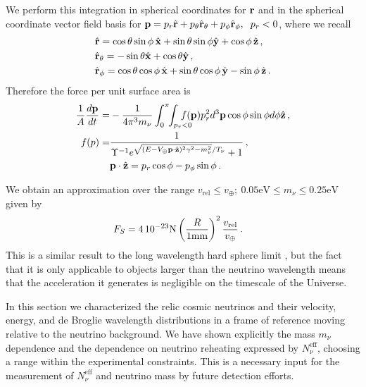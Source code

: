 We perform this integration in spherical coordinates for ${\bf r}$ and in the spherical coordinate vector field basis for ${\bf p}=p_r\hat{\bf r} +p_\theta\hat{\bf r}_\theta+p_\phi\hat{\bf r}_\phi,\hspace{2mm} p_r<0$, where we recall
\begin{align}
&\hat{\bf r}=\cos  \theta \sin \phi \, \hat{\bf x}+\sin \theta \sin \phi \hat{\bf y}+\cos  \phi\,\hat{\bf z}\notag\,,\\
&\hat{\bf r}_\theta=-\sin \theta \hat{\bf x}+\cos \theta \hat{\bf y}\,,\\
&\hat{\bf r}_\phi=\cos \theta \cos \phi\,\hat{\bf x}+\sin \theta \cos \phi \,\hat{\bf y}-\sin \phi \, \hat{\bf z}\notag\,.
\end{align}
Therefore the force per unit surface area is
\begin{align}
\frac{1}{A}\frac{d{\bf p}}{dt}=&-\frac{1}{4\pi^3 m_\nu}\int_0^\pi\!\!\int_{p_r<0}\!\!\!\!\!\!\!\! f({\bf p}) p_r^2  d^3{\bf p}\cos \phi \sin \phi  d\phi\hat{\bf z}\,,\notag\\
f({\bf}p)=&\frac{1}{  \Upsilon^{-1}e^{\sqrt{( E-V_\oplus {\bf p}\cdot \hat {\bf z})^2\gamma^2-m_\nu^2}/T_\nu}+1 }\,,\\
          &{\bf p}\cdot\hat{\bf z}=p_r\cos \phi-p_\phi\sin\phi \,.\notag
\end{align}

We obtain an approximation over the range $v_{\text{rel}}\leq v_\oplus ;\ 0.05\text{eV}\leq m_\nu\leq 0.25\text{eV}$ given by
\begin{align}
&F_S =  4\,10^{-23} \text{N}\left(\frac{R}{1{\rm mm}}\right)^2\frac{v_{\text{rel}}}{ v_\oplus}\,.
\end{align}
This is a similar result to the long wavelength hard sphere limit , but the fact that it is only applicable to objects larger than the neutrino wavelength means that the acceleration it generates is negligible on the timescale of the Universe.

In this section we characterized the relic cosmic neutrinos and their velocity, energy, and de Broglie wavelength distributions in a frame of reference moving relative to the neutrino background. We have shown explicitly the mass $m_\nu$ dependence and the dependence on neutrino reheating expressed by $N_\nu^{\mathrm{eff}}$, choosing a range within the experimental constraints. This is a necessary input for the measurement of $N_\nu^{\mathrm{eff}}$ and neutrino mass by future detection efforts.  

